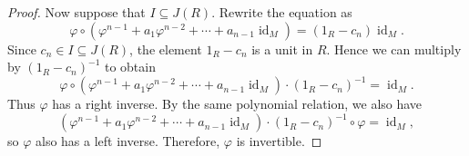 \begin{proof}
	Now suppose that $I \subseteq J(R)$. Rewrite the equation as
	$$\varphi \circ (\varphi^{n-1} + a_1 \varphi^{n-2} + \cdots + a_{n-1} \operatorname{id}_M) = (1_R - c_n) \operatorname{id}_M.$$
	Since $c_n \in I \subseteq J(R)$, the element $1_R - c_n$ is a unit in $R$. Hence we can multiply by $(1_R - c_n)^{-1}$ to obtain
	$$\varphi \circ (\varphi^{n-1} + a_1 \varphi^{n-2} + \cdots + a_{n-1} \operatorname{id}_M) \cdot (1_R - c_n)^{-1} = \operatorname{id}_M.$$
	Thus $\varphi$ has a right inverse. By the same polynomial relation, we also have
	$$(\varphi^{n-1} + a_1 \varphi^{n-2} + \cdots + a_{n-1} \operatorname{id}_M) \cdot (1_R - c_n)^{-1} \circ \varphi = \operatorname{id}_M,$$
	so $\varphi$ also has a left inverse. Therefore, $\varphi$ is invertible.
\end{proof}